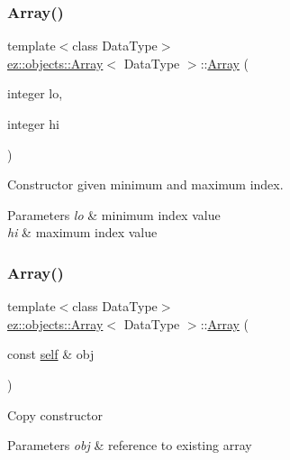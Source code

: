 \subsubsection{\texorpdfstring{Array()}{Array()}\hspace{0.1cm}{\footnotesize\ttfamily [2/5]}}
{\footnotesize\ttfamily template$<$class Data\+Type$>$ \\
\hyperlink{classez_1_1objects_1_1Array}{ez\+::objects\+::\+Array}$<$ Data\+Type $>$\+::\hyperlink{classez_1_1objects_1_1Array}{Array} (\begin{DoxyParamCaption}\item[{integer}]{lo,  }\item[{integer}]{hi }\end{DoxyParamCaption})\hspace{0.3cm}{\ttfamily [inline]}}

Constructor given minimum and maximum index. 
\begin{DoxyParams}{Parameters}
{\em lo} & minimum index value \\
\hline
{\em hi} & maximum index value \\
\hline
\end{DoxyParams}
\mbox{\label{classez_1_1objects_1_1Array_a9ece37ee368a988a62351e8df1cdf220}} 
\subsubsection{\texorpdfstring{Array()}{Array()}\hspace{0.1cm}{\footnotesize\ttfamily [3/5]}}
{\footnotesize\ttfamily template$<$class Data\+Type$>$ \\
\hyperlink{classez_1_1objects_1_1Array}{ez\+::objects\+::\+Array}$<$ Data\+Type $>$\+::\hyperlink{classez_1_1objects_1_1Array}{Array} (\begin{DoxyParamCaption}\item[{const \hyperlink{classez_1_1objects_1_1Array}{self} \&}]{obj }\end{DoxyParamCaption})\hspace{0.3cm}{\ttfamily [inline]}}

Copy constructor 
\begin{DoxyParams}{Parameters}
{\em obj} & reference to existing array \\
\hline
\end{DoxyParams}
\mbox{\label{classez_1_1objects_1_1Array_acc9a9ce3babaa4f1aa6d744304e2ccd0}} 
